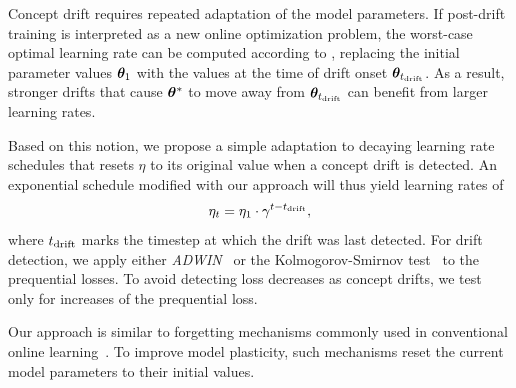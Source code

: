 \documentclass{article} %
\begin{document}
Concept drift requires repeated adaptation of the model parameters.
If post-drift training is interpreted as a new online optimization problem, the worst-case optimal learning rate can be computed according to , replacing the initial parameter values ${\bm{\theta}}_1$ with the values at the time of drift onset ${\bm{\theta}}_{t_{\rm{drift}}}$.
As a result, stronger drifts that cause ${\bm{\theta}}^*$ to move away from ${\bm{\theta}}_{t_{\rm{drift}}}$ can benefit from larger learning rates.

Based on this notion, we propose a simple adaptation to decaying learning rate schedules that resets $\eta$ to its original value when a concept drift is detected.
An exponential schedule modified with our approach will thus yield learning rates of
\begin{equation}
   \eta_t = \eta_1 \cdot \gamma^{t-t_{\rm{drift}}},
\end{equation}\label{eq:drift_reset}
where $t_{\rm{drift}}$ marks the timestep at which the drift was last detected.
For drift detection, we apply either \textit{ADWIN}~\citep{bifetLearningTimeChangingData2007} or the Kolmogorov-Smirnov test~\citep{masseyKolmogorovSmirnovTestGoodness1951} to the prequential losses.
To avoid detecting loss decreases as concept drifts, we test only for increases of the prequential loss.

Our approach is similar to forgetting mechanisms commonly used in conventional online learning~\citep{gamaSurveyConceptDrift2014}.
To improve model plasticity, such mechanisms  reset the current model parameters to their initial values.

\end{document}
